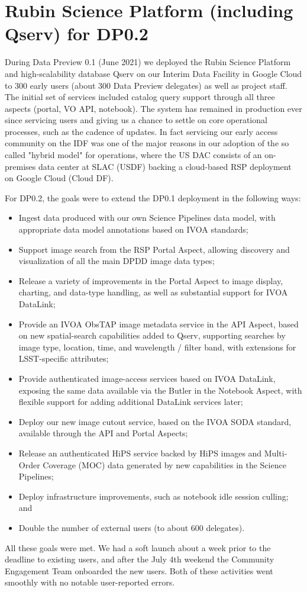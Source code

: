 \section{Rubin Science Platform (including Qserv) for DP0.2} \label{sec:rsp}

During Data Preview 0.1 (June 2021) we deployed the Rubin Science Platform and high-scalability database Qserv on our Interim Data Facility in Google Cloud to 300 early users (about 300 Data Preview delegates) as well as project staff. The initial set of services included catalog query support through all three aspects (portal, VO API, notebook). The system has remained in production ever since servicing users and giving us a chance to settle on core operational processes, such as the cadence of updates. In fact servicing our early access community on the IDF was one of the major reasons in our adoption of the so called "hybrid model" for operations, where the US DAC consists of an on-premises data center at SLAC (USDF) backing a cloud-based RSP deployment on Google Cloud (Cloud DF).

For DP0.2, the goals were to extend the DP0.1 deployment in the following ways:

\begin{itemize}
    \item Ingest data produced with our own Science Pipelines data model, with appropriate data model annotations based on IVOA standards;
    \item Support image search from the RSP Portal Aspect, allowing discovery and visualization of all the main DPDD image data types;
    \item Release a variety of improvements in the Portal Aspect to image display, charting, and data-type handling, as well as substantial support for IVOA DataLink;
    \item Provide an IVOA ObsTAP image metadata service in the API Aspect, based on new spatial-search capabilities added to Qserv, supporting searches by image type, location, time, and wavelength / filter band, with extensions for LSST-specific attributes;
    \item Provide authenticated image-access services based on IVOA DataLink, exposing the same data available via the Butler in the Notebook Aspect, with flexible support for adding additional DataLink services later;
    \item Deploy our new image cutout service, based on the IVOA SODA standard, available through the API and Portal Aspects;
    \item Release an authenticated HiPS service backed by HiPS images and Multi-Order Coverage (MOC) data generated by new capabilities in the Science Pipelines;
    \item Deploy infrastructure improvements, such as notebook idle session culling; and
    \item Double the number of external users (to about 600 delegates).
\end{itemize}

All these goals were met.
We had a soft launch about a week prior to the deadline to existing users, and after the July 4th weekend the Community Engagement Team onboarded the new users. Both of these activities went smoothly with no notable user-reported errors.



